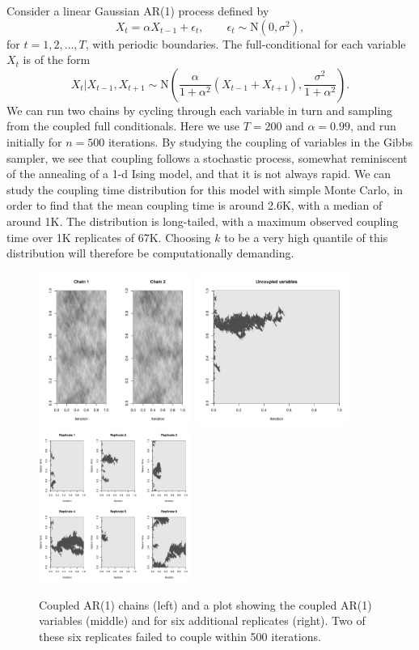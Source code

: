 \documentclass[11pt,a4paper]{article}
\begin{document}
Consider a linear Gaussian AR(1) process defined by
$$
X_t = \alpha X_{t-1} + \epsilon_t,\qquad \epsilon_t \sim {\mathrm N}(0,\sigma^2),
$$
for $t=1,2,\ldots,T$, with periodic boundaries. The full-conditional for each variable $X_t$ is of the form
$$
X_t|X_{t-1},X_{t+1} \sim {\mathrm N}\left(\frac{\alpha}{1+\alpha^2}(X_{t-1}+X_{t+1}), \frac{\sigma^2}{1+\alpha^2} \right).
$$
We can run two chains by cycling through each variable in turn and sampling from the coupled full conditionals. Here we use $T=200$ and $\alpha=0.99$, and run initially for $n=500$ iterations. By studying the coupling of variables in the Gibbs sampler, we see that coupling follows a stochastic process, somewhat reminiscent of the annealing of a 1-d Ising model, and that it is not always rapid. We can study the coupling time distribution for this model with simple Monte Carlo, in order to find that the mean coupling time is around 2.6K, with a median of around 1K. The distribution is long-tailed, with a maximum observed coupling time over 1K replicates of 67K. Choosing $k$ to be a very high quantile of this distribution will therefore be computationally demanding.

\begin{figure}
  \centerline{
    \includegraphics[height=5cm]{figs/coupled-chains}
    \qquad
    \includegraphics[height=5cm]{figs/uncoupled}
    \qquad
  \includegraphics[height=5cm]{figs/uncoupled6}
  }
\caption{Coupled AR(1) chains (left) and a plot showing the coupled AR(1) variables (middle) and for six additional replicates (right). Two of these six replicates failed to couple within 500 iterations.}
\end{figure}
\end{document}
